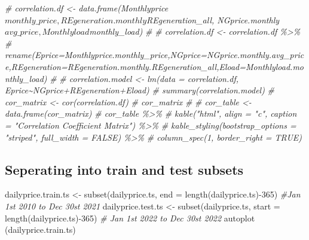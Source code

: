 \documentclass[
]{article}
\newenvironment{Shaded}{\begin{snugshade}}{\end{snugshade}}
\newcommand{\AttributeTok}[1]{\textcolor[rgb]{0.77,0.63,0.00}{#1}}
\newcommand{\CommentTok}[1]{\textcolor[rgb]{0.56,0.35,0.01}{\textit{#1}}}
\newcommand{\DecValTok}[1]{\textcolor[rgb]{0.00,0.00,0.81}{#1}}
\newcommand{\FunctionTok}[1]{\textcolor[rgb]{0.00,0.00,0.00}{#1}}
\newcommand{\NormalTok}[1]{#1}
\newcommand{\OtherTok}[1]{\textcolor[rgb]{0.56,0.35,0.01}{#1}}
\newcommand{\SpecialCharTok}[1]{\textcolor[rgb]{0.00,0.00,0.00}{#1}}
\begin{document}
\begin{Shaded}
\begin{Highlighting}[]
\CommentTok{\# correlation.df \textless{}{-} data.frame(Monthlyprice$monthly\_price,REgeneration.monthly$REgeneration\_all, NGprice.monthly$avg\_price,Monthlyload$monthly\_load)}
\CommentTok{\# }
\CommentTok{\# correlation.df \textless{}{-} correlation.df \%\textgreater{}\%}
\CommentTok{\#   rename(Eprice=Monthlyprice.monthly\_price,NGprice=NGprice.monthly.avg\_price,REgeneration=REgeneration.monthly.REgeneration\_all,Eload=Monthlyload.monthly\_load)}
\CommentTok{\# }
\CommentTok{\# correlation.model \textless{}{-} lm(data = correlation.df, Eprice\textasciitilde{}NGprice+REgeneration+Eload)}
\CommentTok{\# summary(correlation.model)}
\CommentTok{\# cor\_matrix \textless{}{-} cor(correlation.df)}
\CommentTok{\# cor\_matrix}
\CommentTok{\# }
\CommentTok{\# cor\_table \textless{}{-} data.frame(cor\_matrix)}
\CommentTok{\# cor\_table \%\textgreater{}\%}
\CommentTok{\#   kable("html", align = "c", caption = "Correlation Coefficient Matrix") \%\textgreater{}\%}
\CommentTok{\#   kable\_styling(bootstrap\_options = "striped", full\_width = FALSE) \%\textgreater{}\%}
\CommentTok{\#   column\_spec(1, border\_right = TRUE)}
\end{Highlighting}
\end{Shaded}

\hypertarget{seperating-into-train-and-test-subsets}{%
\subsection{Seperating into train and test
subsets}\label{seperating-into-train-and-test-subsets}}

\begin{Shaded}
\begin{Highlighting}[]
\NormalTok{dailyprice.train.ts }\OtherTok{\textless{}{-}} \FunctionTok{subset}\NormalTok{(dailyprice.ts,}
                                   \AttributeTok{end =} \FunctionTok{length}\NormalTok{(dailyprice.ts)}\SpecialCharTok{{-}}\DecValTok{365}\NormalTok{) }\CommentTok{\#Jan 1st 2010 to Dec 30st 2021}
\NormalTok{dailyprice.test.ts }\OtherTok{\textless{}{-}} \FunctionTok{subset}\NormalTok{(dailyprice.ts,}
                                   \AttributeTok{start =} \FunctionTok{length}\NormalTok{(dailyprice.ts)}\SpecialCharTok{{-}}\DecValTok{365}\NormalTok{) }\CommentTok{\# Jan 1st 2022 to Dec 30st 2022}
\FunctionTok{autoplot}\NormalTok{ (dailyprice.train.ts)}
\end{Highlighting}
\end{Shaded}
\end{document}
